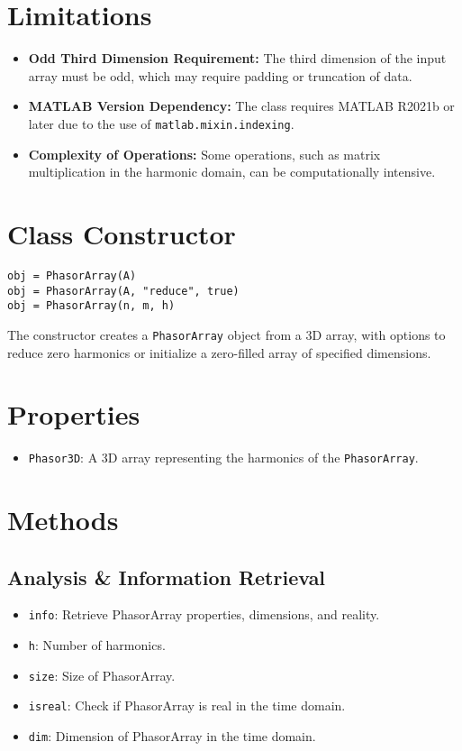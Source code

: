 \section{Limitations}
\begin{itemize}
    \item \textbf{Odd Third Dimension Requirement:} The third dimension of the input array must be odd, which may require padding or truncation of data.
    \item \textbf{MATLAB Version Dependency:} The class requires MATLAB R2021b or later due to the use of \texttt{matlab.mixin.indexing}.
    \item \textbf{Complexity of Operations:} Some operations, such as matrix multiplication in the harmonic domain, can be computationally intensive.
\end{itemize}

\section{Class Constructor}
\begin{verbatim}
obj = PhasorArray(A)
obj = PhasorArray(A, "reduce", true)
obj = PhasorArray(n, m, h)
\end{verbatim}
The constructor creates a \texttt{PhasorArray} object from a 3D array, with options to reduce zero harmonics or initialize a zero-filled array of specified dimensions.

\section{Properties}
\begin{itemize}
    \item \texttt{Phasor3D}: A 3D array representing the harmonics of the \texttt{PhasorArray}.
\end{itemize}

\section{Methods}
\subsection{Analysis \& Information Retrieval}
\begin{itemize}
    \item \texttt{info}: Retrieve PhasorArray properties, dimensions, and reality.
    \item \texttt{h}: Number of harmonics.
    \item \texttt{size}: Size of PhasorArray.
    \item \texttt{isreal}: Check if PhasorArray is real in the time domain.
    \item \texttt{dim}: Dimension of PhasorArray in the time domain.
\end{itemize}

